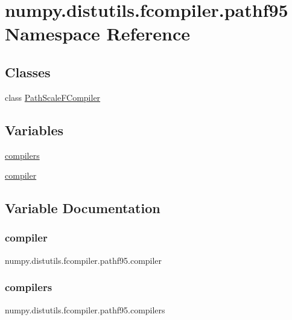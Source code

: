 \hypertarget{namespacenumpy_1_1distutils_1_1fcompiler_1_1pathf95}{}\section{numpy.\+distutils.\+fcompiler.\+pathf95 Namespace Reference}
\label{namespacenumpy_1_1distutils_1_1fcompiler_1_1pathf95}
\subsection*{Classes}
\begin{DoxyCompactItemize}
\item 
class \hyperlink{classnumpy_1_1distutils_1_1fcompiler_1_1pathf95_1_1PathScaleFCompiler}{Path\+Scale\+F\+Compiler}
\end{DoxyCompactItemize}
\subsection*{Variables}
\begin{DoxyCompactItemize}
\item 
\hyperlink{namespacenumpy_1_1distutils_1_1fcompiler_1_1pathf95_a41e006d593cbc5c62cf67db719677b68}{compilers}
\item 
\hyperlink{namespacenumpy_1_1distutils_1_1fcompiler_1_1pathf95_a89fe9fbd8adfc8b7f29ffb9b92a3160b}{compiler}
\end{DoxyCompactItemize}


\subsection{Variable Documentation}
\mbox{\label{namespacenumpy_1_1distutils_1_1fcompiler_1_1pathf95_a89fe9fbd8adfc8b7f29ffb9b92a3160b}} 
\subsubsection{\texorpdfstring{compiler}{compiler}}
{\footnotesize\ttfamily numpy.\+distutils.\+fcompiler.\+pathf95.\+compiler}

\mbox{\label{namespacenumpy_1_1distutils_1_1fcompiler_1_1pathf95_a41e006d593cbc5c62cf67db719677b68}} 
\subsubsection{\texorpdfstring{compilers}{compilers}}
{\footnotesize\ttfamily numpy.\+distutils.\+fcompiler.\+pathf95.\+compilers}

